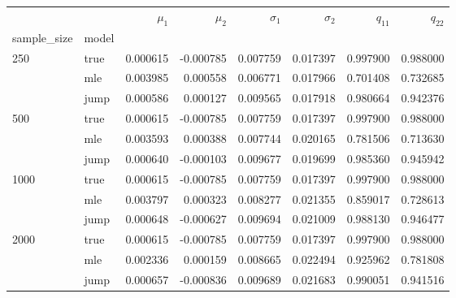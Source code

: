 \begin{tabular}{llrrrrrr}
\toprule
     &      &   $\mu_1$ &   $\mu_2$ &  $\sigma_1$ &  $\sigma_2$ &    $q_11$ &    $q_22$ \\
sample_size & model &           &           &             &             &           &           \\
\midrule
250  & true &  0.000615 & -0.000785 &    0.007759 &    0.017397 &  0.997900 &  0.988000 \\
     & mle &  0.003985 &  0.000558 &    0.006771 &    0.017966 &  0.701408 &  0.732685 \\
     & jump &  0.000586 &  0.000127 &    0.009565 &    0.017918 &  0.980664 &  0.942376 \\
500  & true &  0.000615 & -0.000785 &    0.007759 &    0.017397 &  0.997900 &  0.988000 \\
     & mle &  0.003593 &  0.000388 &    0.007744 &    0.020165 &  0.781506 &  0.713630 \\
     & jump &  0.000640 & -0.000103 &    0.009677 &    0.019699 &  0.985360 &  0.945942 \\
1000 & true &  0.000615 & -0.000785 &    0.007759 &    0.017397 &  0.997900 &  0.988000 \\
     & mle &  0.003797 &  0.000323 &    0.008277 &    0.021355 &  0.859017 &  0.728613 \\
     & jump &  0.000648 & -0.000627 &    0.009694 &    0.021009 &  0.988130 &  0.946477 \\
2000 & true &  0.000615 & -0.000785 &    0.007759 &    0.017397 &  0.997900 &  0.988000 \\
     & mle &  0.002336 &  0.000159 &    0.008665 &    0.022494 &  0.925962 &  0.781808 \\
     & jump &  0.000657 & -0.000836 &    0.009689 &    0.021683 &  0.990051 &  0.941516 \\
\bottomrule
\end{tabular}
